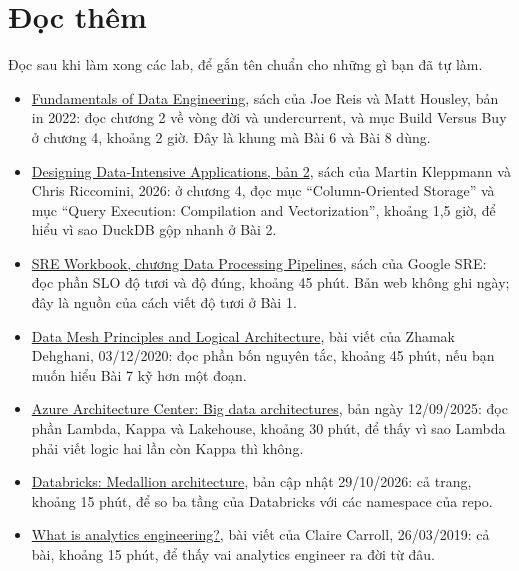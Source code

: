 \section{Đọc thêm}

Đọc sau khi làm xong các lab, để gắn tên chuẩn cho những gì bạn đã tự làm.

\begin{itemize}
  \item \href{https://www.oreilly.com/library/view/fundamentals-of-data/9781098108298/}{Fundamentals of Data Engineering}, sách của Joe Reis và Matt Housley, bản in 2022: đọc chương 2 về vòng đời và undercurrent, và mục Build Versus Buy ở chương 4, khoảng 2 giờ. Đây là khung mà Bài 6 và Bài 8 dùng.
  \item \href{https://martin.kleppmann.com/2026/03/24/designing-data-intensive-applications-2e.html}{Designing Data-Intensive Applications, bản 2}, sách của Martin Kleppmann và Chris Riccomini, 2026: ở chương 4, đọc mục ``Column-Oriented Storage'' và mục ``Query Execution: Compilation and Vectorization'', khoảng 1,5 giờ, để hiểu vì sao DuckDB gộp nhanh ở Bài 2.
  \item \href{https://sre.google/workbook/data-processing/}{SRE Workbook, chương Data Processing Pipelines}, sách của Google SRE: đọc phần SLO độ tươi và độ đúng, khoảng 45 phút. Bản web không ghi ngày; đây là nguồn của cách viết độ tươi ở Bài 1.
  \item \href{https://martinfowler.com/articles/data-mesh-principles.html}{Data Mesh Principles and Logical Architecture}, bài viết của Zhamak Dehghani, 03/12/2020: đọc phần bốn nguyên tắc, khoảng 45 phút, nếu bạn muốn hiểu Bài 7 kỹ hơn một đoạn.
  \item \href{https://learn.microsoft.com/en-us/azure/architecture/databases/guide/big-data-architectures}{Azure Architecture Center: Big data architectures}, bản ngày 12/09/2025: đọc phần Lambda, Kappa và Lakehouse, khoảng 30 phút, để thấy vì sao Lambda phải viết logic hai lần còn Kappa thì không.
  \item \href{https://docs.databricks.com/aws/en/lakehouse/medallion}{Databricks: Medallion architecture}, bản cập nhật 29/10/2026: cả trang, khoảng 15 phút, để so ba tầng của Databricks với các namespace của repo.
  \item \href{https://www.getdbt.com/what-is-analytics-engineering}{What is analytics engineering?}, bài viết của Claire Carroll, 26/03/2019: cả bài, khoảng 15 phút, để thấy vai analytics engineer ra đời từ đâu.
\end{itemize}

